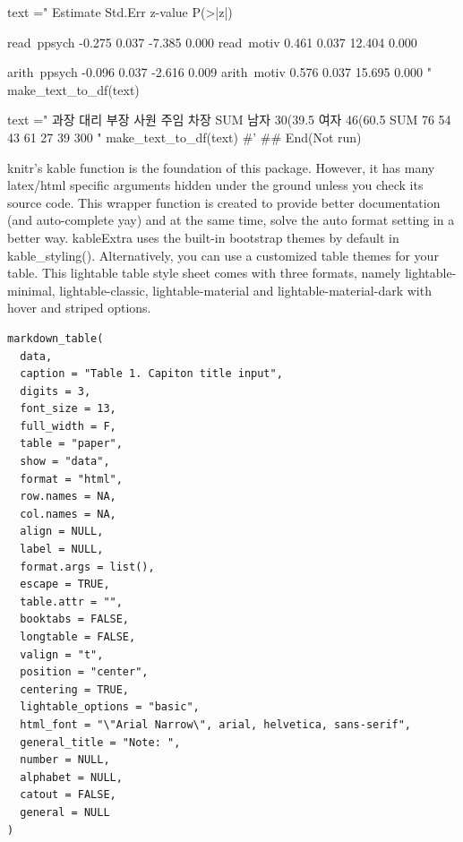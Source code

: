 \documentclass[a4paper]{book}
\begin{document}
\begin{Examples}
\begin{ExampleCode}
text ="                   Estimate  Std.Err  z-value  P(>|z|)

    read~ppsych           -0.275    0.037   -7.385    0.000
    read~motiv             0.461    0.037   12.404    0.000

    arith~ppsych           -0.096    0.037   -2.616    0.009
     arith~motiv             0.576    0.037   15.695    0.000
"
make_text_to_df(text)



text =" 과장 대리 부장 사원 주임 차장 SUM
남자 30(39.5%
여자 46(60.5%
SUM 76 54 43 61 27 39 300
"
make_text_to_df(text)
#' 
## End(Not run)

\end{ExampleCode}
\end{Examples}
%
\begin{Description}
knitr's kable function is the foundation of this package. However, it has many latex/html specific arguments hidden under the ground unless you check its source code. This wrapper function is created to provide better documentation (and auto-complete yay) and at the same time, solve the auto format setting in a better way.
kableExtra uses the built-in bootstrap themes by default in kable\_styling(). Alternatively, you can use a customized table themes for your table. This lightable table style sheet comes with three formats, namely lightable-minimal, lightable-classic, lightable-material and lightable-material-dark with hover and striped options.
\end{Description}
%
\begin{Usage}
\begin{verbatim}
markdown_table(
  data,
  caption = "Table 1. Capiton title input",
  digits = 3,
  font_size = 13,
  full_width = F,
  table = "paper",
  show = "data",
  format = "html",
  row.names = NA,
  col.names = NA,
  align = NULL,
  label = NULL,
  format.args = list(),
  escape = TRUE,
  table.attr = "",
  booktabs = FALSE,
  longtable = FALSE,
  valign = "t",
  position = "center",
  centering = TRUE,
  lightable_options = "basic",
  html_font = "\"Arial Narrow\", arial, helvetica, sans-serif",
  general_title = "Note: ",
  number = NULL,
  alphabet = NULL,
  catout = FALSE,
  general = NULL
)
\end{verbatim}
\end{Usage}
\end{document}
